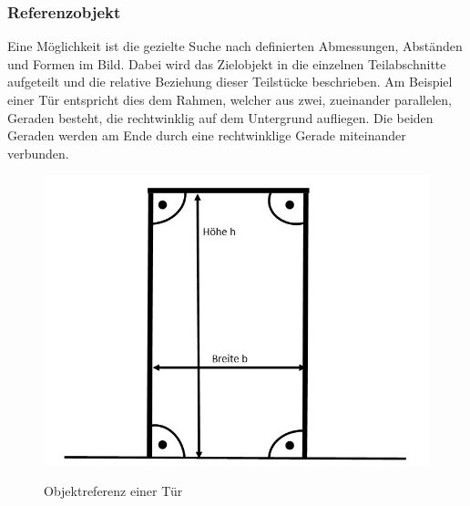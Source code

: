 \subsubsection{Referenzobjekt}
Eine Möglichkeit ist die gezielte Suche nach definierten Abmessungen, Abständen und Formen im Bild. Dabei wird das Zielobjekt in die einzelnen Teilabschnitte aufgeteilt und die relative Beziehung dieser Teilstücke beschrieben. Am Beispiel einer Tür entspricht dies dem Rahmen, welcher aus zwei, zueinander parallelen, Geraden besteht, die rechtwinklig auf dem Untergrund aufliegen. Die beiden Geraden werden am Ende durch eine rechtwinklige Gerade miteinander verbunden. \newline

\begin{figure}[ht]
	\centering
	\includegraphics[scale=0.55]{Bilder/door.jpg}
	\label{fig:door}
	\caption{Objektreferenz einer Tür}
\end{figure}

